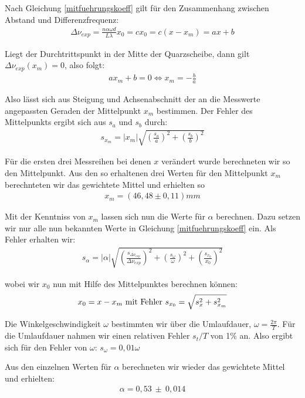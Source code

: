 \documentclass[12pt]{article}
\begin{document}
Nach Gleichung \ref{mitfuehrungskoeff} gilt für den Zusammenhang zwischen Abstand und Differenzfrequenz:
\begin{align}
 \varDelta \nu_{exp}=\frac{n\alpha\omega d}{L \lambda}x_0=cx_0=c(x-x_m)=ax+b
\end{align}

Liegt der Durchtrittspunkt in der Mitte der Quarzscheibe, dann gilt $\varDelta\nu_{exp}(x_m)=0$, also
folgt:
\begin{align}
 ax_m+b=0 \Leftrightarrow x_m=-\frac{b}{a}
\end{align}

Also lässt sich aus Steigung und Achsenabschnitt der an die Messwerte angepassten Geraden der Mittelpunkt $x_m$ bestimmen. Der Fehler des Mittelpunkts ergibt sich aus $s_a$ und $s_b$ durch:
\begin{align}
  s_{x_m}=|x_m|\sqrt{\left( \frac{s_a}{a}\right)^2 + \left( \frac{s_b}{b}\right) ^2 }
\end{align}

Für die ersten drei Messreihen bei denen $x$ verändert wurde berechneten wir so den Mittelpunkt. Aus den so erhaltenen drei Werten für den Mittelpunkt $x_m$ berechnteten wir das gewichtete Mittel und erhielten so
\begin{align}
 x_m=(46,48 \pm 0,11) mm
\end{align}

Mit der Kenntniss von $x_m$ lassen sich nun die Werte für $\alpha$ berechnen. Dazu setzen wir nur alle nun bekannten Werte in Gleichung \ref{mitfuehrungskoeff} ein. Als Fehler erhalten wir:
\begin{align}
 s_{\alpha} = |\alpha|\sqrt{\left( \frac{s_{\varDelta\nu_{exp}}}{\varDelta\nu_{exp}}\right)^2+\left( \frac{s_{\omega}}{\omega}\right)^2+\left( \frac{s_{x_0}}{x_0}\right)^2}
\end{align}

wobei wir $x_0$ nun mit Hilfe des Mittelpunktes berechnen können:
\begin{align}
 x_0=x-x_m \textnormal{  mit Fehler  } s_{x_0}=\sqrt{s_x^2+s_{x_m}^2}
\end{align}

Die Winkelgeschwindigkeit $\omega$ bestimmten wir über die Umlaufdauer, $\omega=\frac{2\pi}{T}$. Für die Umlaufdauer nahmen wir einen relativen Fehler $s_t/T$ von 1\% an. Also ergibt sich für den Fehler von $\omega$: $s_{\omega}=0,01\omega$

Aus den einzelnen Werten für $\alpha$ berechneten wir wieder das gewichtete Mittel und erhielten:
\begin{align}
 \alpha = 0,53 \ \pm \ 0,014
\end{align}
\end{document}
